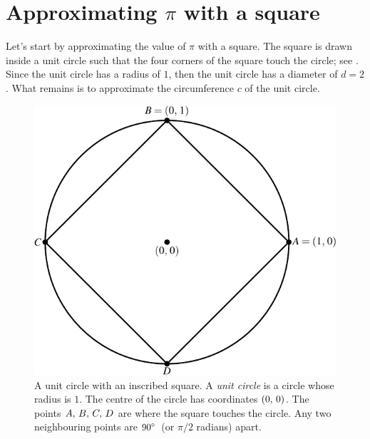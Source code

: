 \documentclass[a4paper,oneside,12pt]{article}
\begin{document}

\section{Approximating $\pi$ with a square}

Let's start by approximating the value of $\pi$ with a square.  The
square is drawn inside a unit circle such that the four corners of the
square touch the circle; see .
Since the unit circle has a radius of $1$, then the unit circle has a
diameter of $d = 2$.  What remains is to approximate the circumference
$c$ of the unit circle.

\begin{figure}[!htbp]
\centering
\includegraphics[scale=1.1]{image/05/circle-square.pdf}
\caption{%
  A unit circle with an inscribed square.  A \emph{unit circle} is a
  circle whose radius is $1$.  The centre of the circle has
  coordinates $\left\lparen{0},\, {0}\right\rparen$.  The points ${A},\, {B},\, {C},\, {D}$ are
  where the square touches the circle.  Any two neighbouring points
  are ${90}^{\circ}$~(or $\pi / 2$ radians) apart.
}
\label{fig:circle_inscribed_square}
\end{figure}
\end{document}
